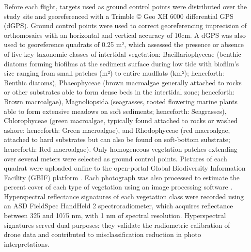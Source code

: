 \documentclass[
  number]{elsarticle}
\begin{document}
Before each flight, targets used as ground control points were
distributed over the study site and georeferenced with a Trimble © Geo
XH 6000 differential GPS (dGPS). Ground control points were used to
correct georeferencing imprecision of orthomosaics with an horizontal
and vertical accuracy of 10cm. A dGPS was also used to georeference
quadrats of 0.25 m², which assessed the presence or absence of five key
taxonomic classes of intertidal vegetation: Bacillariophyceae (benthic
diatoms forming biofilms at the sediment surface during low tide with
biofilm's size ranging from small patches (m²) to entire mudflats (km²);
henceforth: Benthic diatoms), Phaeophyceae (brown macroalgae generally
attached to rocks or other substrates able to form dense beds in the
intertidal zone; henceforth: Brown macroalgae), Magnoliopsida
(seagrasses, rooted flowering marine plants able to form extensive
meadows on soft sediments; henceforth: Seagrasses), Chlorophyceae (green
macroalgae, typically found attached to rocks or washed ashore;
henceforth: Green macroalgae), and Rhodophyceae (red macroalgae,
attached to hard substrates but can also be found on soft-bottom
substrate; henceforth: Red macroalgae). Only homogeneous vegetation
patches extending over several meters were selected as ground control
points. Pictures of each quadrat were uploaded online to the open-portal
Global Biodiversity Information Facility (GBIF) platform
\citep{BedeGbif}. Each photograph was also processed to estimate the
percent cover of each type of vegetation using an image processing
software \citep[ImageJ,][]{schneider2012nih}. Hyperspectral reflectance
signatures of each vegetation class were recorded using an ASD FieldSpec
HandHeld 2 spectroradiometer, which acquires reflectance between 325 and
1075 nm, with 1 nm of spectral resolution. Hyperspectral signatures
served dual purposes: they validate the radiometric calibration of drone
data and contributed to misclassification reduction in photo
interpretations.
\end{document}
